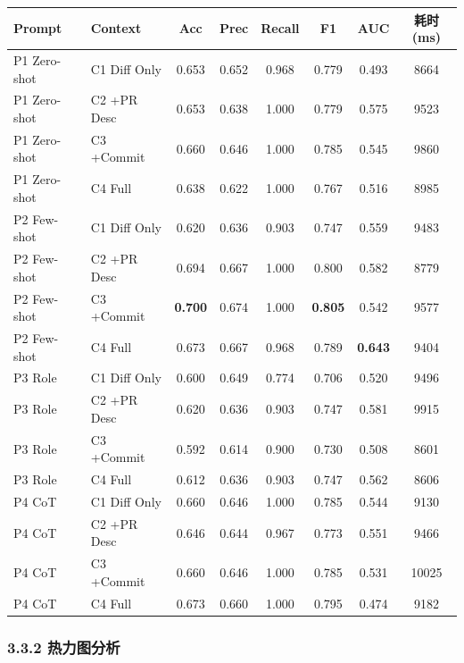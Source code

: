 \documentclass{experimentreport}
\begin{document}
{\begin{center}
\scriptsize
\begin{tabular}{|l|l|c|c|c|c|c|c|}
\hline
\textbf{Prompt} & \textbf{Context} & \textbf{Acc} & \textbf{Prec} & \textbf{Recall} & \textbf{F1} & \textbf{AUC} & \textbf{耗时(ms)} \\
\hline
P1 Zero-shot & C1 Diff Only & 0.653 & 0.652 & 0.968 & 0.779 & 0.493 & 8664 \\
P1 Zero-shot & C2 +PR Desc  & 0.653 & 0.638 & 1.000 & 0.779 & 0.575 & 9523 \\
P1 Zero-shot & C3 +Commit   & 0.660 & 0.646 & 1.000 & 0.785 & 0.545 & 9860 \\
P1 Zero-shot & C4 Full       & 0.638 & 0.622 & 1.000 & 0.767 & 0.516 & 8985 \\
\hline
P2 Few-shot  & C1 Diff Only & 0.620 & 0.636 & 0.903 & 0.747 & 0.559 & 9483 \\
P2 Few-shot  & C2 +PR Desc  & 0.694 & 0.667 & 1.000 & 0.800 & 0.582 & 8779 \\
\rowcolor{yellow!20}
P2 Few-shot  & C3 +Commit   & \textbf{0.700} & 0.674 & 1.000 & \textbf{0.805} & 0.542 & 9577 \\
P2 Few-shot  & C4 Full       & 0.673 & 0.667 & 0.968 & 0.789 & \textbf{0.643} & 9404 \\
\hline
P3 Role      & C1 Diff Only & 0.600 & 0.649 & 0.774 & 0.706 & 0.520 & 9496 \\
P3 Role      & C2 +PR Desc  & 0.620 & 0.636 & 0.903 & 0.747 & 0.581 & 9915 \\
P3 Role      & C3 +Commit   & 0.592 & 0.614 & 0.900 & 0.730 & 0.508 & 8601 \\
P3 Role      & C4 Full       & 0.612 & 0.636 & 0.903 & 0.747 & 0.562 & 8606 \\
\hline
P4 CoT       & C1 Diff Only & 0.660 & 0.646 & 1.000 & 0.785 & 0.544 & 9130 \\
P4 CoT       & C2 +PR Desc  & 0.646 & 0.644 & 0.967 & 0.773 & 0.551 & 9466 \\
P4 CoT       & C3 +Commit   & 0.660 & 0.646 & 1.000 & 0.785 & 0.531 & 10025 \\
P4 CoT       & C4 Full       & 0.673 & 0.660 & 1.000 & 0.795 & 0.474 & 9182 \\
\hline
\end{tabular}
\end{center}

\subsubsection*{3.3.2 热力图分析}

}
\end{document}
